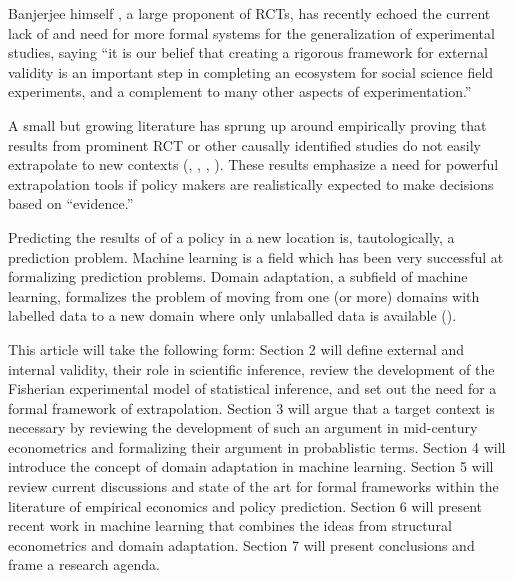 \documentclass[a4paper,12pt]{article}
\begin{document}
Banjerjee himself \parencite{Snowberg2016}, a large proponent of RCTs, has recently echoed the current lack of and need for more formal systems for the generalization of experimental studies, saying ``it is our belief that creating a rigorous framework for external validity is an important step in completing an ecosystem for social science field experiments, and a complement to many other aspects of experimentation.''

A small but growing literature has sprung up around empirically proving that results from prominent RCT or other causally identified studies do not easily extrapolate to new contexts (\cite{Pritchett2016}, \cite{Allcott2015}, \cite{Bisbee2017}, \cite{Rosenzweig2019}). These results emphasize a need for powerful extrapolation tools if policy makers are realistically expected to make decisions based on ``evidence.'' 

Predicting the results of of a policy in a new location is, tautologically, a prediction problem. Machine learning is a field which has been very successful at formalizing prediction problems. Domain adaptation, a subfield of machine learning, formalizes the problem of moving from one (or more) domains with labelled data to a new domain where only unlaballed data is available (\cite[for a survey, see][]{Pan2010}).

This article will take the following form: Section 2 will define external and internal validity, their role in scientific inference, review the development of the Fisherian experimental model of statistical inference, and set out the need for a formal framework of extrapolation. Section 3 will argue that a target context is necessary by reviewing the development of such an argument in mid-century econometrics and formalizing their argument in probablistic terms. Section 4 will introduce the concept of domain adaptation in machine learning. Section 5 will review current discussions and state of the art for formal frameworks within the literature of empirical economics and policy prediction. Section 6 will present recent work in machine learning that combines the ideas from structural econometrics and domain adaptation. Section 7 will present conclusions and frame a research agenda. 


\end{document}

